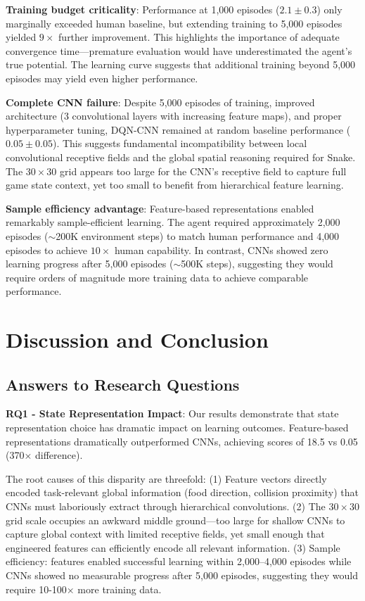 \documentclass[10pt,a4paper,twocolumn]{article}
\begin{document}
\textbf{Training budget criticality}: Performance at 1,000 episodes ($2.1 \pm 0.3$) only marginally exceeded human baseline, but extending training to 5,000 episodes yielded $9\times$ further improvement. This highlights the importance of adequate convergence time---premature evaluation would have underestimated the agent's true potential. The learning curve suggests that additional training beyond 5,000 episodes may yield even higher performance.

\textbf{Complete CNN failure}: Despite 5,000 episodes of training, improved architecture (3 convolutional layers with increasing feature maps), and proper hyperparameter tuning, DQN-CNN remained at random baseline performance ($0.05 \pm 0.05$). This suggests fundamental incompatibility between local convolutional receptive fields and the global spatial reasoning required for Snake. The $30 \times 30$ grid appears too large for the CNN's receptive field to capture full game state context, yet too small to benefit from hierarchical feature learning.

\textbf{Sample efficiency advantage}: Feature-based representations enabled remarkably sample-efficient learning. The agent required approximately 2,000 episodes ($\sim$200K environment steps) to match human performance and 4,000 episodes to achieve $10\times$ human capability. In contrast, CNNs showed zero learning progress after 5,000 episodes ($\sim$500K steps), suggesting they would require orders of magnitude more training data to achieve comparable performance.

\section{Discussion and Conclusion}

\subsection{Answers to Research Questions}

\textbf{RQ1 - State Representation Impact}: Our results demonstrate that state representation choice has dramatic impact on learning outcomes. Feature-based representations dramatically outperformed CNNs, achieving scores of 18.5 vs 0.05 (370× difference). 

The root causes of this disparity are threefold: (1) Feature vectors directly encoded task-relevant global information (food direction, collision proximity) that CNNs must laboriously extract through hierarchical convolutions. (2) The $30 \times 30$ grid scale occupies an awkward middle ground---too large for shallow CNNs to capture global context with limited receptive fields, yet small enough that engineered features can efficiently encode all relevant information. (3) Sample efficiency: features enabled successful learning within 2,000--4,000 episodes while CNNs showed no measurable progress after 5,000 episodes, suggesting they would require 10-100× more training data.
\end{document}
